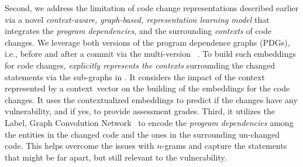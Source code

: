 Second, we address the limitation of code change representations described earlier via
a novel
{\em context-aware, graph-based, representation learning model}
that
integrates the {\em program dependencies}, and the surrounding {\em
  contexts} of code changes. We leverage both versions of the program
dependence graphs (PDGs), i.e., before and after a commit via the multi-version {\mvpdg}~\cite{flexeme-fse20}. To build such embeddings
for code changes, {\tool} {\em explicitly represents the contexts}
surrounding the changed statements via the sub-graphs in {\mvpdg}. It
considers the impact of the context represented by a
context~vector on the building of the embeddings for the code
changes. It uses the contextualized embeddings to predict if the
changes have any vulnerability, and if yes, to provide assessment
grades. Third, it utilizes the Label, Graph Convolution
Network~\cite{label-gcn} to encode the {\em program dependencies}
among the entities in the changed code and the ones in the surrounding
un-changed code. This helps overcome the issues with $n$-grams and
capture the statements that might be far apart, but still relevant to the
vulnerability.

